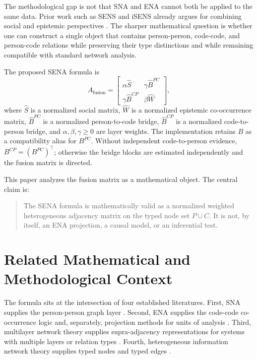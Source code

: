 \documentclass[11pt]{article}
\theoremstyle{definition}
\newcommand{\Af}{A_{\mathrm{fusion}}}
\newcommand{\Shat}{\widehat S}
\newcommand{\What}{\widehat W}
\newcommand{\Bpchat}{\widehat B^{PC}}
\newcommand{\Bcphat}{\widehat B^{CP}}
\begin{document}
The methodological gap is not that SNA and ENA cannot both be applied to the
same data. Prior work such as SENS and iSENS already argues for combining
social and epistemic perspectives \cite{gasevic2019,swiecki2020}. The sharper mathematical question is whether
one can construct a single object that contains person-person, code-code, and
person-code relations while preserving their type distinctions and while
remaining compatible with standard network analysis.

The proposed SENA formula is
\begin{equation}
\label{eq:fusion}
\Af =
\begin{bmatrix}
\alpha \Shat & \gamma \Bpchat \\
\gamma \Bcphat & \beta \What
\end{bmatrix},
\end{equation}
where \(\Shat\) is a normalized social matrix, \(\What\) is a normalized
epistemic co-occurrence matrix, \(\Bpchat\) is a normalized person-to-code
bridge, \(\Bcphat\) is a normalized code-to-person bridge, and
\(\alpha,\beta,\gamma\ge 0\) are layer weights. The implementation retains
\(B\) as a compatibility alias for \(B^{PC}\). Without independent
code-to-person evidence, \(B^{CP}=(B^{PC})^\top\); otherwise the bridge blocks
are estimated independently and the fusion matrix is directed.

This paper analyzes the fusion matrix as a mathematical object. The
central claim is:

\begin{quote}
The SENA formula is mathematically valid as a normalized weighted heterogeneous
adjacency matrix on the typed node set \(P\cup C\). It is not, by itself, an
ENA projection, a causal model, or an inferential test.
\end{quote}

\section{Related Mathematical and Methodological Context}

The formula sits at the intersection of four established literatures. First,
SNA supplies the person-person graph layer \cite{wasserman1994}. Second, ENA
supplies the code-code co-occurrence logic and, separately, projection methods
for units of analysis \cite{shaffer2016,siebert2017,bowman2021}. Third,
multilayer network theory supplies supra-adjacency representations for systems
with multiple layers or relation types \cite{kivela2014,mucha2010}. Fourth,
heterogeneous information network theory supplies typed nodes and typed edges
\cite{sun2012}.
\end{document}
